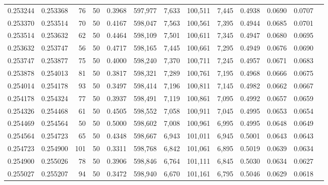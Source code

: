 \begin{tabular}{rrrrrrrrrrrrr}
0.253244 & 0.253368 &    76 &  50 &                                     0.3968 & 597,977 &   7,633 & 100,511 &   7,445 & 0.4938 & 0.0690 & 0.0707 \\
0.253370 & 0.253514 &    70 &  50 &                                     0.4167 & 598,047 &   7,563 & 100,561 &   7,395 & 0.4944 & 0.0685 & 0.0701 \\
0.253514 & 0.253632 &    62 &  50 &                                     0.4464 & 598,109 &   7,501 & 100,611 &   7,345 & 0.4947 & 0.0680 & 0.0695 \\
0.253632 & 0.253747 &    56 &  50 &                                     0.4717 & 598,165 &   7,445 & 100,661 &   7,295 & 0.4949 & 0.0676 & 0.0690 \\
0.253747 & 0.253877 &    75 &  50 &                                     0.4000 & 598,240 &   7,370 & 100,711 &   7,245 & 0.4957 & 0.0671 & 0.0683 \\
0.253878 & 0.254013 &    81 &  50 &                                     0.3817 & 598,321 &   7,289 & 100,761 &   7,195 & 0.4968 & 0.0666 & 0.0675 \\
0.254014 & 0.254178 &    93 &  50 &                                     0.3497 & 598,414 &   7,196 & 100,811 &   7,145 & 0.4982 & 0.0662 & 0.0667 \\
0.254178 & 0.254324 &    77 &  50 &                                     0.3937 & 598,491 &   7,119 & 100,861 &   7,095 & 0.4992 & 0.0657 & 0.0659 \\
0.254326 & 0.254468 &    61 &  50 &                                     0.4505 & 598,552 &   7,058 & 100,911 &   7,045 & 0.4995 & 0.0653 & 0.0654 \\
0.254469 & 0.254564 &    50 &  50 &                                     0.5000 & 598,602 &   7,008 & 100,961 &   6,995 & 0.4995 & 0.0648 & 0.0649 \\
0.254564 & 0.254723 &    65 &  50 &                                     0.4348 & 598,667 &   6,943 & 101,011 &   6,945 & 0.5001 & 0.0643 & 0.0643 \\
0.254723 & 0.254900 &   101 &  50 &                                     0.3311 & 598,768 &   6,842 & 101,061 &   6,895 & 0.5019 & 0.0639 & 0.0634 \\
0.254900 & 0.255026 &    78 &  50 &                                     0.3906 & 598,846 &   6,764 & 101,111 &   6,845 & 0.5030 & 0.0634 & 0.0627 \\
0.255027 & 0.255207 &    94 &  50 &                                     0.3472 & 598,940 &   6,670 & 101,161 &   6,795 & 0.5046 & 0.0629 & 0.0618 \\

\end{tabular}
